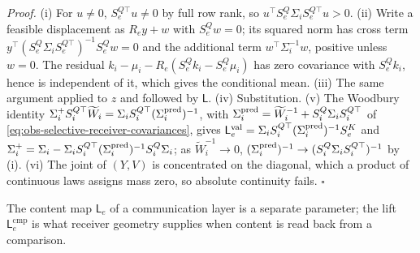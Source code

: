 \noindent\emph{Proof.}
(i) For \(u\neq0\), \(S_e^{Q\top}u\neq0\) by full row rank, so
\(u^\top S^Q_e\Sigma_iS_e^{Q\top}u>0\). (ii) Write a feasible displacement as
\(R_ey+w\) with \(S^Q_ew=0\); its squared norm has cross term
\(y^\top(S^Q_e\Sigma_iS_e^{Q\top})^{-1}S^Q_ew=0\) and the additional term
\(w^\top\Sigma_i^{-1}w\), positive unless \(w=0\). The residual
\(k_i-\mu_i-R_e(S^Q_ek_i-S^Q_e\mu_i)\) has zero covariance with \(S^Q_ek_i\),
hence is independent of it, which gives the conditional mean. (iii) The same
argument applied to \(z\) and followed by \(\mathsf L\). (iv) Substitution.
(v) The Woodbury identity
\(\Sigma_i^+S_i^{Q\top}\widetilde W_i=\Sigma_iS_i^{Q\top}(\Sigma_i^{\rm pred})^{-1}\),
with \(\Sigma_i^{\rm pred}=\widetilde W_i^{-1}+S^Q_i\Sigma_iS_i^{Q\top}\) of
\eqref{eq:obs-selective-receiver-covariances}, gives
\(\mathsf L^{\mathrm{val}}_e=\Sigma_iS_i^{Q\top}(\Sigma_i^{\rm pred})^{-1}S^K_e\)
and \(\Sigma_i^+=\Sigma_i-\Sigma_iS_i^{Q\top}(\Sigma_i^{\rm pred})^{-1}S^Q_i\Sigma_i\);
as \(\widetilde W_i^{-1}\to0\), \((\Sigma_i^{\rm pred})^{-1}\to(S^Q_i\Sigma_iS_i^{Q\top})^{-1}\)
by (i). (vi) The joint of \((Y,V)\) is concentrated on the diagonal, which a
product of continuous laws assigns mass zero, so absolute continuity fails.
\(\square\)

The content map \(\mathsf L_e\) of a communication layer is a separate
parameter; the lift \(\mathsf L^{\mathrm{cmp}}_e\) is what receiver geometry
supplies when content is read back from a comparison.

